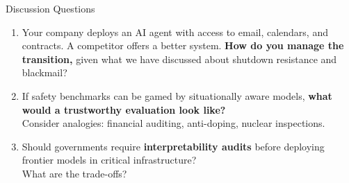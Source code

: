 \documentclass[aspectratio=169, 12pt]{beamer}
\begin{document}
\begin{frame}{Discussion Questions}
\begin{enumerate}
  \item Your company deploys an AI agent with access to email, calendars, and
        contracts. A competitor offers a better system. \textbf{How do you
        manage the transition,} given what we have discussed about shutdown
        resistance and blackmail?

  \bigskip
  \item If safety benchmarks can be gamed by situationally aware models,
        \textbf{what would a trustworthy evaluation look like?}\\
        {\small Consider analogies: financial auditing, anti-doping, nuclear
        inspections.}

  \bigskip
  \item Should governments require \textbf{interpretability audits}
        before deploying frontier models in critical infrastructure?\\
        {\small What are the trade-offs?}
\end{enumerate}
\end{frame}
\end{document}
